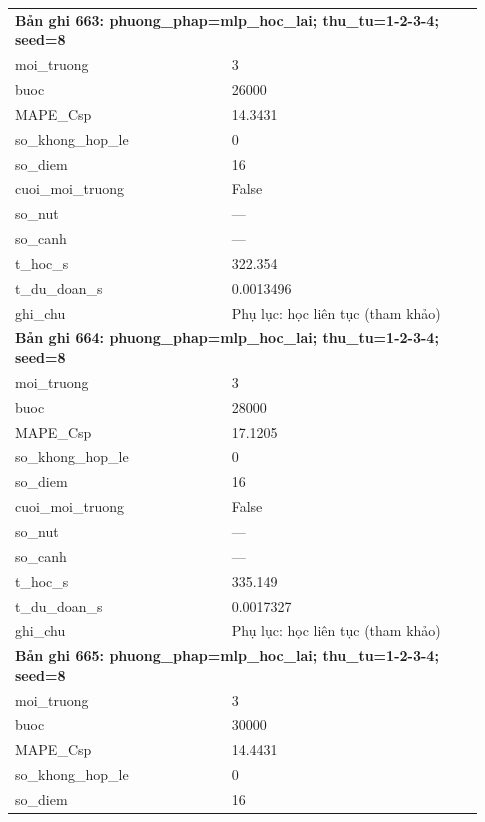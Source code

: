 \begin{longtable}{p{0.43\linewidth}p{0.50\linewidth}}
\midrule
\multicolumn{2}{p{0.95\linewidth}}{\textbf{Bản ghi 663: phuong\_phap=mlp\_hoc\_lai; thu\_tu=1-2-3-4; seed=8}} \\
moi\_\allowbreak truong & 3 \\
buoc & 26000 \\
MAPE\_\allowbreak Csp & 14.3431 \\
so\_\allowbreak khong\_\allowbreak hop\_\allowbreak le & 0 \\
so\_\allowbreak diem & 16 \\
cuoi\_\allowbreak moi\_\allowbreak truong & False \\
so\_\allowbreak nut & — \\
so\_\allowbreak canh & — \\
t\_\allowbreak hoc\_\allowbreak s & 322.354 \\
t\_\allowbreak du\_\allowbreak doan\_\allowbreak s & 0.0013496 \\
ghi\_\allowbreak chu & Phụ lục: học liên tục (tham khảo) \\
\midrule
\multicolumn{2}{p{0.95\linewidth}}{\textbf{Bản ghi 664: phuong\_phap=mlp\_hoc\_lai; thu\_tu=1-2-3-4; seed=8}} \\
moi\_\allowbreak truong & 3 \\
buoc & 28000 \\
MAPE\_\allowbreak Csp & 17.1205 \\
so\_\allowbreak khong\_\allowbreak hop\_\allowbreak le & 0 \\
so\_\allowbreak diem & 16 \\
cuoi\_\allowbreak moi\_\allowbreak truong & False \\
so\_\allowbreak nut & — \\
so\_\allowbreak canh & — \\
t\_\allowbreak hoc\_\allowbreak s & 335.149 \\
t\_\allowbreak du\_\allowbreak doan\_\allowbreak s & 0.0017327 \\
ghi\_\allowbreak chu & Phụ lục: học liên tục (tham khảo) \\
\midrule
\multicolumn{2}{p{0.95\linewidth}}{\textbf{Bản ghi 665: phuong\_phap=mlp\_hoc\_lai; thu\_tu=1-2-3-4; seed=8}} \\
moi\_\allowbreak truong & 3 \\
buoc & 30000 \\
MAPE\_\allowbreak Csp & 14.4431 \\
so\_\allowbreak khong\_\allowbreak hop\_\allowbreak le & 0 \\
so\_\allowbreak diem & 16 \\

\end{longtable}
